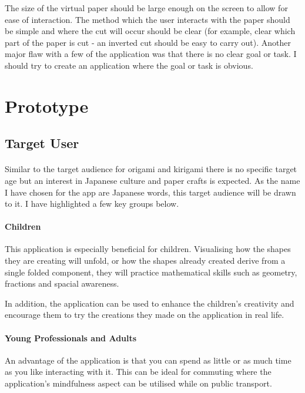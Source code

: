 \documentclass[11pt]{article}
\begin{document}
            The size of the virtual paper should be large enough on the screen to allow for ease of interaction. The method which the user interacts with the paper should be simple and where the cut will occur should be clear (for example, clear which part of the paper is cut - an inverted cut should be easy to carry out). Another major flaw with a few of the application was that there is no clear goal or task. I should try to create an application where the goal or task is obvious.


\newpage
\section{Prototype}

    \subsection{Target User}
    
            \paragraph{}
            Similar to the target audience for origami and kirigami there is no specific target age but an interest in Japanese culture and paper crafts is expected. As the name I have chosen for the app are Japanese words, this target audience will be drawn to it. I have highlighted a few key groups below. 
            
            \paragraph{Children}
            This application is especially beneficial for children. Visualising how the shapes they are creating will unfold, or how the shapes already created derive from a single folded component, they will practice mathematical skills such as geometry, fractions and spacial awareness.
            
            In addition, the application can be used to enhance the children's creativity and encourage them to try the creations they made on the application in real life. 
            
            \paragraph{Young Professionals and Adults}
            An advantage of the application is that you can spend as little or as much time as you like interacting with it. This can be ideal for commuting where the application's mindfulness aspect can be utilised while on public transport.
\end{document}
